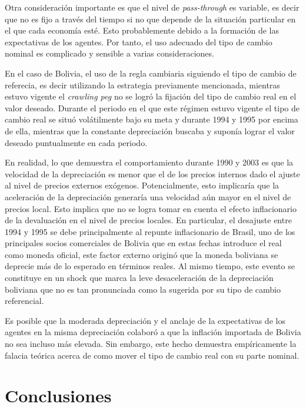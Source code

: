 \documentclass[12pt,letterpaper]{article}
\begin{document}
Otra consideración importante es que el nivel de \emph{pass-through} es variable, es decir que no es fijo a través del tiempo si no que depende de la situación particular en el que cada economía esté. Esto probablemente debido a la formación de las expectativas de los agentes. Por tanto, el uso adecuado del tipo de cambio nominal es complicado y sensible a varias consideraciones.

En el caso de Bolivia, el uso de la regla cambiaria siguiendo el tipo de cambio de referecia, es decir  utilizando la estrategia previamente mencionada, mientras estuvo vigente el \emph{crawling peg} no se logró la fijación del tipo de cambio real en el valor deseado. Durante el periodo en el que este régimen estuvo vigente el tipo de cambio real se situó volátilmente bajo su meta y durante 1994 y 1995 por encima de ella, mientras que la constante depreciación buscaba y suponía lograr el valor deseado puntualmente en cada periodo.

En realidad, lo que demuestra el comportamiento durante 1990 y 2003 es que la velocidad de la depreciación es menor que el de los precios internos dado el ajuste al nivel de precios externos exógenos. Potencialmente, esto implicaría que la aceleración de la depreciación generaría una velocidad aún mayor en el nivel de precios local. Esto implica que no se logra tomar en cuenta el efecto inflacionario de la devaluación en el nivel de precios locales. En particular, el desajuste entre 1994 y 1995 se debe principalmente al repunte inflacionario de Brasil, uno de los principales socios comerciales de Bolivia que en estas fechas introduce el real como moneda oficial, este factor externo originó que la moneda boliviana se deprecie más de lo esperado en términos reales. Al mismo tiempo, este evento se constituye en un shock que marca la leve desaceleración de la depreciación boliviana que no es tan pronunciada como la sugerida por su tipo de cambio referencial.

Es posible que la moderada depreciación y el anclaje de la expectativas de los agentes en la misma depreciación colaboró a que la inflación importada de Bolivia no sea incluso más elevada. Sin embargo, este hecho demuestra empíricamente la falacia teórica acerca de como mover el tipo de cambio real con su parte nominal.











\section*{Conclusiones}\label{concl}
\end{document}
